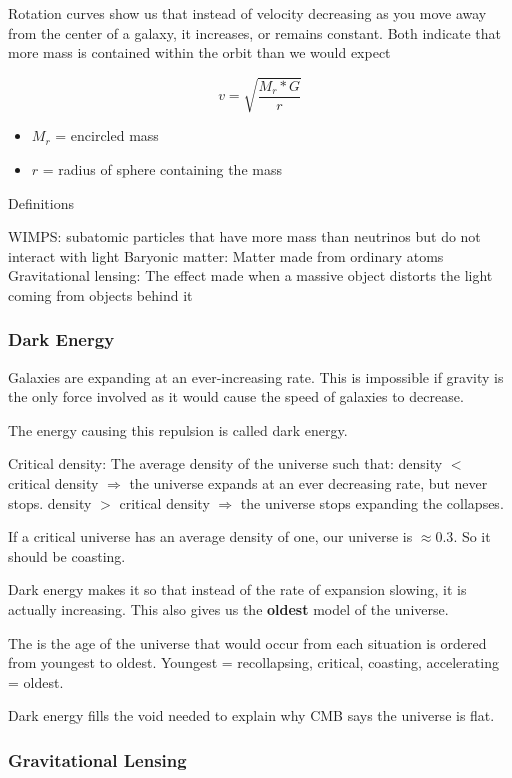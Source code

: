 Rotation curves show us that instead of velocity decreasing as you move away from the center of a galaxy, it increases, or remains constant.  Both indicate that more mass is contained within the orbit than we would expect

$$v = \sqrt{\frac{M_r * G}{r}}$$

\begin{itemize}
    \item $M_r$ = encircled mass
    \item $r$ = radius of sphere containing the mass
\end{itemize}

Definitions

WIMPS: subatomic particles that have more mass than neutrinos but do not interact with light
Baryonic matter: Matter made from ordinary atoms
Gravitational lensing: The effect made when a massive object distorts the light coming from objects behind it

\subsubsection{Dark Energy}

Galaxies are expanding at an ever-increasing rate.  This is impossible if gravity is the only force involved as it would cause the speed of galaxies to decrease.

The energy causing this repulsion is called dark energy.

Critical density: The average density of the universe such that:
density $<$ critical density $\Rightarrow$ the universe expands at an ever decreasing rate, but never stops.
density $>$ critical density $\Rightarrow$ the universe stops expanding the collapses.

If a critical universe has an average density of one, our universe is $\approx 0.3$.  So it should be coasting.

Dark energy makes it so that instead of the rate of expansion slowing, it is actually increasing.  This also gives us the \textbf{oldest} model of the universe.

The is the age of the universe that would occur from each situation is ordered from youngest to oldest.  Youngest = recollapsing, critical, coasting, accelerating = oldest.

Dark energy fills the void needed to explain why CMB says the universe is flat.

\subsubsection{Gravitational Lensing}

